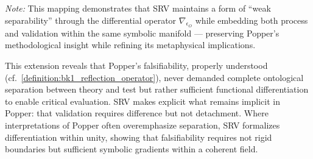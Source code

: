 \begin{scholium}
\medskip\noindent\textit{Note:} This mapping demonstrates that SRV maintains a form of ``weak separability'' through the differential operator $\nabla_{\epsilon_O}$ while embedding both process and validation within the same symbolic manifold --- preserving Popper's methodological insight while refining its metaphysical implications.
\end{scholium}
\begin{remark}
\label{remark:bk7_unnamed_remark_05}
This extension reveals that Popper's falsifiability, properly understood (cf.~\ref{definition:bk1_reflection_operator}), never demanded complete ontological separation between theory and test but rather sufficient functional differentiation to enable critical evaluation. SRV makes explicit what remains implicit in Popper: that validation requires difference but not detachment. Where interpretations of Popper often overemphasize separation, SRV formalizes differentiation within unity, showing that falsifiability requires not rigid boundaries but sufficient symbolic gradients within a coherent field.
\end{remark}
